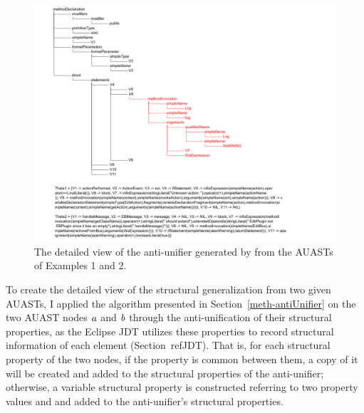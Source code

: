 


\begin{figure} [H]
  \centering\includegraphics [width = \textwidth]{Drawing4/SampleAntiUnifier.png}
  \caption{The detailed view of the anti-unifier generated by  from the AUASTs of Examples 1 and 2.}
  \label{fig:meth-anti-unifier}
\end{figure}



To create the detailed view of the structural generalization from two given AUASTs, I applied the  algorithm presented in Section~\ref{meth-antiUnifier} on the two AUAST nodes $\mathit{a}$ and $\mathit{b}$ through the anti-unification of their structural properties, as the Eclipse JDT utilizes these properties to record structural information of each  element (Section~ref{JDT}). That is, for each structural property of the two nodes, if the property is common between them, a copy of it will be created and added to the structural properties of the anti-unifier; otherwise, a variable structural property is constructed referring to two property values and and added to the anti-unifier's structural properties.




